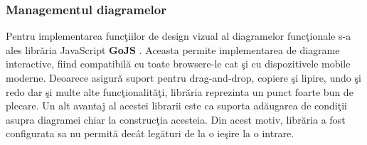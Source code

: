 \subsubsection{Managementul diagramelor}
Pentru implementarea funcţiilor de design vizual al diagramelor funcţionale s-a ales librăria JavaScript \textbf{GoJS} \autocite{gojs}. Aceasta permite implementarea de diagrame interactive, fiind compatibilă cu toate browsere-le cat şi cu dispozitivele mobile moderne. Deoarece asigură suport pentru drag-and-drop, copiere şi lipire, undo şi redo dar şi multe alte funcţionalităţi, librăria reprezinta un punct foarte bun de plecare. Un alt avantaj al acestei librarii este ca suporta adăugarea de condiţii asupra diagramei chiar la construcţia acesteia. Din acest motiv, librăria a fost configurata sa nu permită decât legături de la o ieşire la o intrare.

